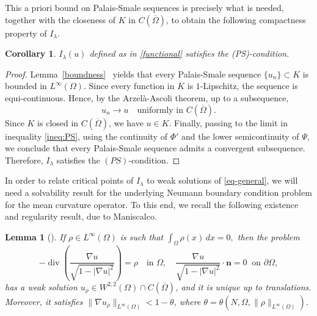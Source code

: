 \documentclass[11pt,reqno]{amsart}
\theoremstyle{plain}
\newtheorem{lemma}[theorem]{Lemma}
\newtheorem{corollary}[theorem]{Corollary}
\theoremstyle{definition}
\numberwithin{equation}{section}
\begin{document}
This a priori bound on Palais-Smale sequences is precisely what is needed, together with the closeness of $K$ in $C(\overline\Omega)$, to obtain the following compactness property of $I_\lambda$.

\begin{corollary}\label{cor:PS}
    $I_\lambda(u)$ defined as in \eqref{functional} satisfies the (PS)-condition.
\end{corollary}
\begin{proof}
   Lemma~\ref{boundness} \ yields that every Palais-Smale sequence $\{u_n\}\subset K$ is bounded in $L^\infty(\Omega)$. Since every function in $K$ is $1$-Lipschitz, the sequence is equi-continuous. Hence, by the Arzelà-Ascoli theorem, up to a subsequence,
$$
u_n\to u
\quad\text{uniformly in } C(\overline\Omega).
$$
Since $K$ is closed in $C(\overline\Omega)$, we have $u\in K$. Finally, passing to the limit in inequality \eqref{ineq:PS}, using the continuity of $\Phi'$ and the lower semicontinuity of $\Psi$, we conclude that every Palais-Smale sequence admits a convergent subsequence. Therefore, $I_\lambda$ satisfies the $(PS)$-condition.
\end{proof}

In order to relate critical points of $I_\lambda$ to weak solutions of \eqref{eq-general}, we will need a solvability result for the underlying Neumann boundary condition problem for the mean curvature operator. To this end, we recall the following existence and regularity result, due to Maniscalco.

\begin{lemma}[{\cite[Theorem 1.1]{Ma26}}]
\label{lemma:existence}
If $\rho \in L^{\infty}(\Omega)$ is such that $\int_\Omega \rho(x) \, dx = 0,$ then the problem
\begin{equation}\label{eq-rho} -\operatorname{div} \left(\frac{\nabla u}{\sqrt{1-|\nabla u|^2}} \right) = \rho \quad \text{in } \Omega, \quad \frac{\nabla u}{\sqrt{1-|\nabla u|^2}}\cdot \mathbf n=0\ \text{ on }\partial\Omega,\end{equation}
has a weak solution $u_\rho \in W^{2,2}(\Omega) \cap C(\overline{\Omega})$, and it is unique up to translations. Moreover, it satisfies $\|\nabla u_\rho\|_{L^{\infty}(\Omega)} < 1- \theta$, where $\theta = \theta(N,\Omega, \|\rho\|_{L^{\infty}(\Omega)})$.
\end{lemma}
\end{document}
